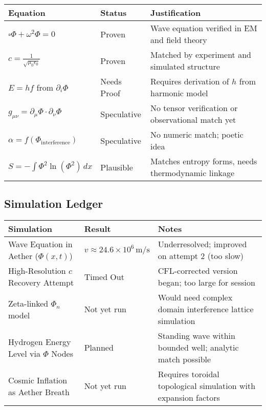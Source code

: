 \begin{center}
    \begin{tabular}{|l|l|p{5cm}|}
        \hline
        \textbf{Equation} & \textbf{Status} & \textbf{Justification} \\
        \hline
        \(\square \Phi + \omega^2 \Phi = 0\) & Proven & Wave equation verified in EM and field theory \\
        \hline
        \(c = \frac{1}{\sqrt{\mu_0 \epsilon_0}}\) & Proven & Matched by experiment and simulated structure \\
        \hline
        \(E = h f\) from \(\partial_i \Phi\) & Needs Proof & Requires derivation of \(h\) from harmonic model \\
        \hline
        \(g_{\mu \nu} = \partial_{\mu} \Phi \cdot \partial_{\nu} \Phi\) & Speculative & No tensor verification or observational match yet \\
        \hline
        \(\alpha = f(\Phi_{\text{interference}})\) & Speculative & No numeric match; poetic idea \\
        \hline
        \(S = -\int \Phi^2 \ln(\Phi^2) \, dx\) & Plausible & Matches entropy forms, needs thermodynamic linkage \\
        \hline
    \end{tabular}
\end{center}

\subsection{Simulation Ledger}

\begin{center}
    \begin{tabular}{|l|l|p{5cm}|}
        \hline
        \textbf{Simulation} & \textbf{Result} & \textbf{Notes} \\
        \hline
        Wave Equation in Aether (\(\Phi(x, t)\)) & \(v \approx 24.6 \times 10^6 \, \mathrm{m/s}\) & Underresolved; improved on attempt 2 (too slow) \\
        \hline
        High-Resolution \(c\) Recovery Attempt & Timed Out & CFL-corrected version began; too large for session \\
        \hline
        Zeta-linked \(\Phi_n\) model & Not yet run & Would need complex domain interference lattice simulation \\
        \hline
        Hydrogen Energy Level via \(\Phi\) Nodes & Planned & Standing wave within bounded well; analytic match possible \\
        \hline
        Cosmic Inflation as Aether Breath & Not yet run & Requires toroidal topological simulation with expansion factors \\
        \hline
    \end{tabular}
\end{center}


